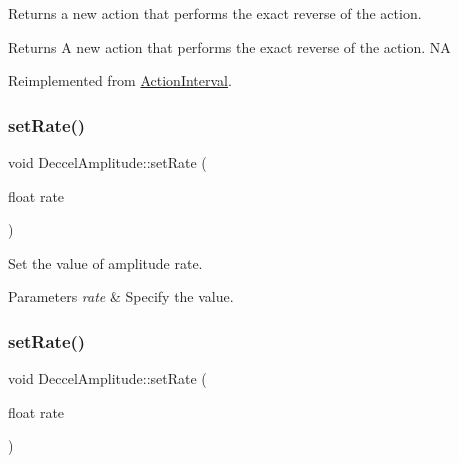 Returns a new action that performs the exact reverse of the action.

\begin{DoxyReturn}{Returns}
A new action that performs the exact reverse of the action.  NA 
\end{DoxyReturn}


Reimplemented from \hyperlink{classActionInterval_a9f9ac7164036a0bc261a72f62a2b2da7}{Action\+Interval}.

\mbox{\label{classDeccelAmplitude_ad73ca698974b6643c865c6debaa0e6da}} 
\subsubsection{\texorpdfstring{set\+Rate()}{setRate()}\hspace{0.1cm}{\footnotesize\ttfamily [1/2]}}
{\footnotesize\ttfamily void Deccel\+Amplitude\+::set\+Rate (\begin{DoxyParamCaption}\item[{float}]{rate }\end{DoxyParamCaption})\hspace{0.3cm}{\ttfamily [inline]}}



Set the value of amplitude rate. 


\begin{DoxyParams}{Parameters}
{\em rate} & Specify the value. \\
\hline
\end{DoxyParams}
\mbox{\label{classDeccelAmplitude_ad73ca698974b6643c865c6debaa0e6da}} 
\subsubsection{\texorpdfstring{set\+Rate()}{setRate()}\hspace{0.1cm}{\footnotesize\ttfamily [2/2]}}
{\footnotesize\ttfamily void Deccel\+Amplitude\+::set\+Rate (\begin{DoxyParamCaption}\item[{float}]{rate }\end{DoxyParamCaption})\hspace{0.3cm}{\ttfamily [inline]}}




